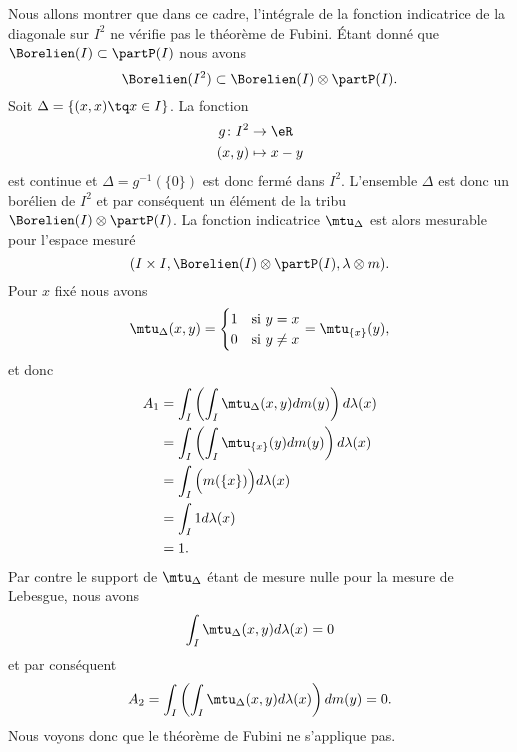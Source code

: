 \begin{example}
	Nous allons montrer que dans ce cadre, l'intégrale de la fonction indicatrice de la diagonale sur \( I^2\) ne vérifie pas le théorème de Fubini. Étant donné que \( \Borelien(I)\subset\partP(I)\) nous avons
	\begin{equation}
		\Borelien(I^2)\subset\Borelien(I)\otimes\partP(I).
	\end{equation}
	Soit \( \Delta=\{ (x,x)\tq x\in I \}\). La fonction
	\begin{equation}
		\begin{aligned}
			g\colon I^2 & \to \eR     \\
			(x,y)       & \mapsto x-y
		\end{aligned}
	\end{equation}
	est continue et \( \Delta=g^{-1}(\{ 0 \})\) est donc fermé dans \( I^2\). L'ensemble \( \Delta\) est donc un borélien de \( I^2\) et par conséquent un élément de la tribu \( \Borelien(I)\otimes\partP(I)\). La fonction indicatrice \( \mtu_{\Delta}\) est alors mesurable pour l'espace mesuré
	\begin{equation}
		(I\times I,\Borelien(I)\otimes\partP(I),\lambda\otimes m).
	\end{equation}
	Pour \( x\) fixé nous avons
	\begin{equation}
		\mtu_{\Delta}(x,y)=\begin{cases}
			1 & \text{si } y= x    \\
			0 & \text{si } y\neq x
		\end{cases}=\mtu_{\{ x \}}(y),
	\end{equation}
	et donc
	\begin{subequations}
		\begin{align}
			A_1 & =\int_I\left( \int_I\mtu_{\Delta}(x,y)dm(y) \right)d\lambda(x) \\
			    & =\int_I\left( \int_I\mtu_{\{ x \}}(y)dm(y) \right)d\lambda(x)  \\
			    & =\int_I\Big( m(\{ x \}) \Big)d\lambda(x)                       \\
			    & =\int_I 1d\lambda(x)                                           \\
			    & =1.
		\end{align}
	\end{subequations}
	Par contre le support de \( \mtu_{\Delta}\) étant de mesure nulle pour la mesure de Lebesgue, nous avons
	\begin{equation}
		\int_I\mtu_{\Delta}(x,y)d\lambda(x)=0
	\end{equation}
	et par conséquent
	\begin{equation}
		A_2=\int_I\left( \int_I\mtu_{\Delta}(x,y)d\lambda(x) \right)dm(y)=0.
	\end{equation}
	Nous voyons donc que le théorème de Fubini ne s'applique pas.
\end{example}

